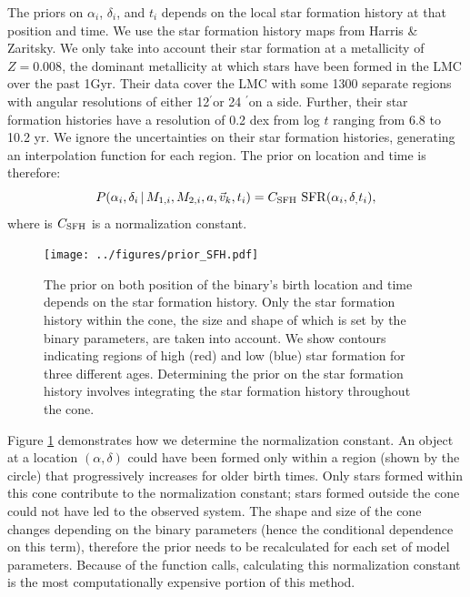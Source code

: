 \documentclass[12pt, preprint]{aastex}
\newcommand{\given}{\,|\,}
\newcommand{\amin}{\ifmmode {^{\prime}\ }\else$^{\prime}$\fi}
\begin{document}
The priors on $\alpha_i$, $\delta_i$, and $t_i$ depends on the local star formation history at that position and time. We use the star formation history maps from Harris \& Zaritsky. We only take into account their star formation at a metallicity of $Z=0.008$, the dominant metallicity at which stars have been formed in the LMC over the past 1Gyr. Their data cover the LMC with some 1300 separate regions with angular resolutions of either 12\amin or 24 \amin on a side. Further, their star formation histories have a resolution of 0.2 dex from log $t$ ranging from 6.8 to 10.2 yr. We ignore the uncertainties on their star formation histories, generating an interpolation function for each region. The prior on location and time is therefore:
\begin{equation}
P(\alpha_i, \delta_i \given M_{1,i}, M_{2,i}, a, \vec{v}_k, t_i) = C_{\rm SFH}\ {\rm SFR}(\alpha_i, \delta_, t_i),
\end{equation}
where is $C_{\rm SFH}$ is a normalization constant. 

\begin{figure}[h!]
\begin{center}
\texttt{[image: ../figures/prior\_SFH.pdf]}
\caption{The prior on both position of the binary's birth location and time depends on the star formation history. Only the star formation history within the cone, the size and shape of which is set by the binary parameters, are taken into account. We show contours indicating regions of high (red) and low (blue) star formation for three different ages. Determining the prior on the star formation history involves integrating the star formation history throughout the cone.}
\label{fig:prior_SFH}
\end{center}
\end{figure}

Figure \ref{fig:prior_SFH} demonstrates how we determine the normalization constant. An object at a location $(\alpha, \delta)$ could have been formed only within a region (shown by the circle) that progressively increases for older birth times. Only stars formed within this cone contribute to the normalization constant; stars formed outside the cone could not have led to the observed system. The shape and size of the cone changes depending on the binary parameters (hence the conditional dependence on this term), therefore the prior needs to be recalculated for each set of model parameters. Because of the function calls, calculating this normalization constant is the most computationally expensive portion of this method. 
\end{document}
